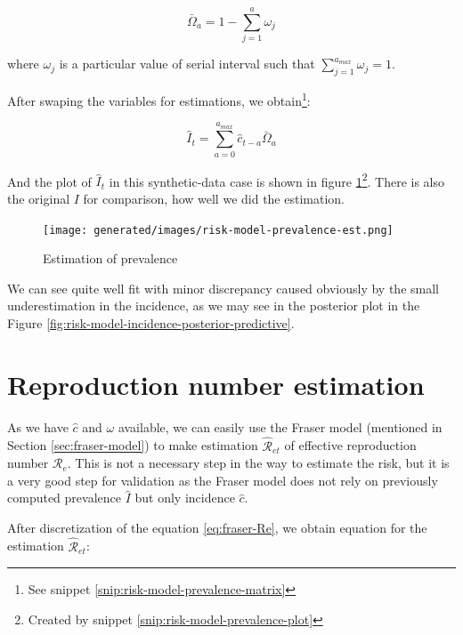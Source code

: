 \documentclass[
  digital, %
  oneside, %
  lof,     %
  lot,     %
]{fithesis4}
\begin{document}
\begin{equation}
  \bar{\Omega}_a = 1 - \sum_{j = 1}^a \omega_j
\end{equation}

\noindent
where $\omega_j$ is a particular value of serial interval such that $\sum_{j = 1}^{a_{max}} \omega_j = 1$.

After swaping the variables for estimations, we obtain\footnote{See snippet \ref{snip:risk-model-prevalence-matrix}}:

\begin{equation}\label{eq:prevalence-est}
  \hat{I}_t = \sum_{a=0}^{a_{max}} \hat{c}_{t - a} \bar{\Omega}_a
\end{equation}

And the plot of $\hat{I}_t$ in this synthetic-data case is shown in figure \ref{fig:risk-model-prevalence-est}\footnote{Created by snippet \ref{snip:risk-model-prevalence-plot}}.
There is also the original $I$ for comparison, how well we did the estimation.

\begin{figure}[H]
  \begin{center}
    \texttt{[image: generated/images/risk-model-prevalence-est.png]}
  \end{center}
  \caption{Estimation of prevalence}
  \label{fig:risk-model-prevalence-est}
\end{figure}

We can see quite well fit with minor discrepancy caused obviously by the small underestimation in the incidence, as we may see in the posterior plot in the Figure \ref{fig:risk-model-incidence-posterior-predictive}.


\section{Reproduction number estimation}

As we have $\hat{c}$ and $\omega$ available, we can easily use the Fraser model (mentioned in Section \ref{sec:fraser-model}) to make estimation $\hat{\mathcal{R}}_{et}$ of effective reproduction number $\mathcal{R}_e$.
This is not a necessary step in the way to estimate the risk, but it is a very good step for validation as the Fraser model does not rely on previously computed prevalence $\hat{I}$ but only incidence $\hat{c}$.

After discretization of the equation \eqref{eq:fraser-Re}, we obtain equation for the estimation $\hat{\mathcal{R}}_{et}$:
\end{document}
